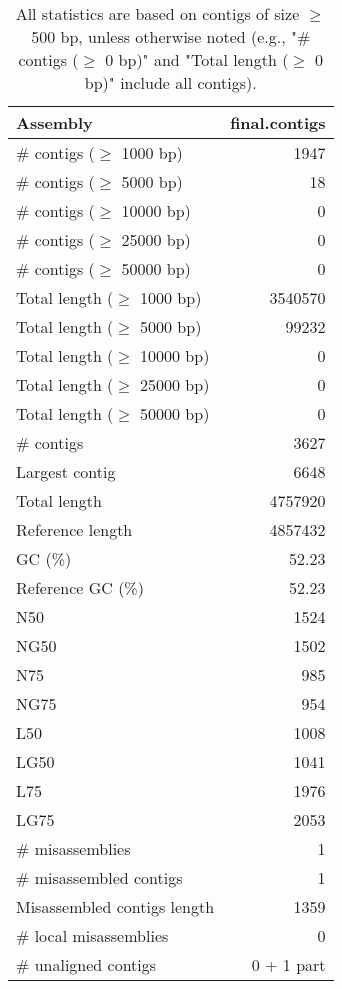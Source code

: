 \documentclass[12pt,a4paper]{article}
\begin{document}
\begin{table}[ht]
\begin{center}
\caption{All statistics are based on contigs of size $\geq$ 500 bp, unless otherwise noted (e.g., "\# contigs ($\geq$ 0 bp)" and "Total length ($\geq$ 0 bp)" include all contigs).}
\begin{tabular}{|l*{1}{|r}|}
\hline
Assembly & final.contigs \\ \hline
\# contigs ($\geq$ 1000 bp) & 1947 \\ \hline
\# contigs ($\geq$ 5000 bp) & 18 \\ \hline
\# contigs ($\geq$ 10000 bp) & 0 \\ \hline
\# contigs ($\geq$ 25000 bp) & 0 \\ \hline
\# contigs ($\geq$ 50000 bp) & 0 \\ \hline
Total length ($\geq$ 1000 bp) & 3540570 \\ \hline
Total length ($\geq$ 5000 bp) & 99232 \\ \hline
Total length ($\geq$ 10000 bp) & 0 \\ \hline
Total length ($\geq$ 25000 bp) & 0 \\ \hline
Total length ($\geq$ 50000 bp) & 0 \\ \hline
\# contigs & 3627 \\ \hline
Largest contig & 6648 \\ \hline
Total length & 4757920 \\ \hline
Reference length & 4857432 \\ \hline
GC (\%) & 52.23 \\ \hline
Reference GC (\%) & 52.23 \\ \hline
N50 & 1524 \\ \hline
NG50 & 1502 \\ \hline
N75 & 985 \\ \hline
NG75 & 954 \\ \hline
L50 & 1008 \\ \hline
LG50 & 1041 \\ \hline
L75 & 1976 \\ \hline
LG75 & 2053 \\ \hline
\# misassemblies & 1 \\ \hline
\# misassembled contigs & 1 \\ \hline
Misassembled contigs length & 1359 \\ \hline
\# local misassemblies & 0 \\ \hline
\# unaligned contigs & 0 + 1 part \\ \hline

\end{tabular}
\end{center}
\end{table}
\end{document}
